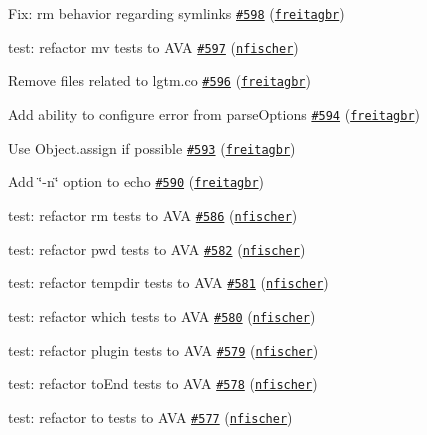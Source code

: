 \begin{DoxyItemize}
\item Fix\+: rm behavior regarding symlinks \href{https://github.com/shelljs/shelljs/pull/598}{\tt \#598} (\href{https://github.com/freitagbr}{\tt freitagbr})
\item test\+: refactor mv tests to A\+VA \href{https://github.com/shelljs/shelljs/pull/597}{\tt \#597} (\href{https://github.com/nfischer}{\tt nfischer})
\item Remove files related to lgtm.\+co \href{https://github.com/shelljs/shelljs/pull/596}{\tt \#596} (\href{https://github.com/freitagbr}{\tt freitagbr})
\item Add ability to configure error from parse\+Options \href{https://github.com/shelljs/shelljs/pull/594}{\tt \#594} (\href{https://github.com/freitagbr}{\tt freitagbr})
\item Use Object.\+assign if possible \href{https://github.com/shelljs/shelljs/pull/593}{\tt \#593} (\href{https://github.com/freitagbr}{\tt freitagbr})
\item Add \char`\"{}-\/n\char`\"{} option to echo \href{https://github.com/shelljs/shelljs/pull/590}{\tt \#590} (\href{https://github.com/freitagbr}{\tt freitagbr})
\item test\+: refactor rm tests to A\+VA \href{https://github.com/shelljs/shelljs/pull/586}{\tt \#586} (\href{https://github.com/nfischer}{\tt nfischer})
\item test\+: refactor pwd tests to A\+VA \href{https://github.com/shelljs/shelljs/pull/582}{\tt \#582} (\href{https://github.com/nfischer}{\tt nfischer})
\item test\+: refactor tempdir tests to A\+VA \href{https://github.com/shelljs/shelljs/pull/581}{\tt \#581} (\href{https://github.com/nfischer}{\tt nfischer})
\item test\+: refactor \textquotesingle{}which\textquotesingle{} tests to A\+VA \href{https://github.com/shelljs/shelljs/pull/580}{\tt \#580} (\href{https://github.com/nfischer}{\tt nfischer})
\item test\+: refactor plugin tests to A\+VA \href{https://github.com/shelljs/shelljs/pull/579}{\tt \#579} (\href{https://github.com/nfischer}{\tt nfischer})
\item test\+: refactor to\+End tests to A\+VA \href{https://github.com/shelljs/shelljs/pull/578}{\tt \#578} (\href{https://github.com/nfischer}{\tt nfischer})
\item test\+: refactor to tests to A\+VA \href{https://github.com/shelljs/shelljs/pull/577}{\tt \#577} (\href{https://github.com/nfischer}{\tt nfischer})

\end{DoxyItemize}
